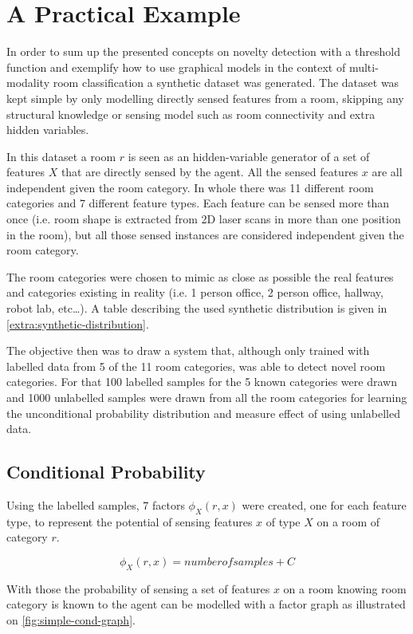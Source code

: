\section{A Practical Example}
\label{sec:unlabelled-data}
In order to sum up the presented concepts on novelty detection with a threshold
function and exemplify how to use graphical models in the context of
multi-modality room classification a synthetic dataset was generated.
The dataset was kept simple by only modelling directly sensed features from a
room, skipping any structural knowledge or sensing model such as room
connectivity and extra hidden variables.

In this dataset a room $r$ is seen as an hidden-variable generator of a set of
features $X$ that are directly sensed by the agent.
All the sensed features $x$ are all independent given the room category.
In whole there was 11 different room categories and 7 different feature types.
Each feature can be sensed more than once (i.e. room shape is extracted from 2D
laser scans in more than one position in the room), but all those sensed
instances are considered independent given the room category.

The room categories were chosen to mimic as close as possible the real features
and categories existing in reality (i.e. 1 person office, 2 person office,
hallway, robot lab, etc\dots). A table describing the used synthetic
distribution is given in \autoref{extra:synthetic-distribution}.

The objective then was to draw a system that, although only trained with
labelled data from 5 of the 11 room categories, was able to detect novel
room categories.
For that 100 labelled samples for the 5 known categories were drawn and 1000 
unlabelled samples were drawn from all the room categories for learning the
unconditional probability distribution and measure effect of using unlabelled
data.

\subsection{Conditional Probability}
Using the labelled samples, 7 factors $\phi_X(r,x)$ were created, one for each
feature type, to represent the potential of sensing features $x$ of type $X$ on
a room of category $r$.

\begin{equation}
\phi_X(r,x) = number of samples + C
\end{equation}

With those the probability of sensing a set of features $x$ on a room knowing
room category is known to the agent can be modelled with a factor graph as
illustrated on \autoref{fig:simple-cond-graph}.

